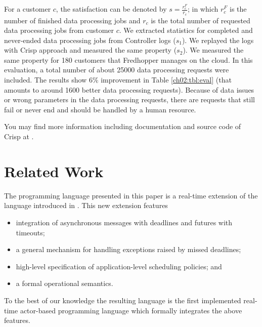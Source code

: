 For a customer $c$, the satisfaction can be denoted by $s = \frac{r^F_c}{r_c}$; in which $r^F_c$ is the number of finished data processing jobs and $r_c$ is the total number of requested data processing jobs from customer $c$. 
We extracted statistics for completed and never-ended data processing jobs from Controller logs ($s_1$).
We replayed the logs with Crisp approach and measured the same property ($s_2$).
We measured the same property for 180 customers that Fredhopper manages on the cloud.
In this evaluation, a total number of about 25000 data processing requests were included.
The results show $6\%$ improvement in Table \ref{ch02:tbl:eval} (that amounts to around 1600 better data processing requests). 
Because of data issues or wrong parameters in the data processing requests, there are requests that still fail or never end and should be handled by a human resource.

You may find more information including documentation and source code of Crisp at .

\section{Related Work} \label{ch02:sec:relwork}
The programming language presented in this paper is a real-time  extension of the  language introduced in  \cite{crisp-sac}. This new extension features
\begin{itemize}
 \item integration of  asynchronous messages with  deadlines and futures with timeouts;
 \item  a general mechanism for handling exceptions raised by missed deadlines;
  \item high-level specification of application-level scheduling policies; and
  \item a formal operational semantics.
\end{itemize}
To the best of our knowledge the resulting language is the first implemented 
real-time actor-based programming language which formally integrates the above features.

